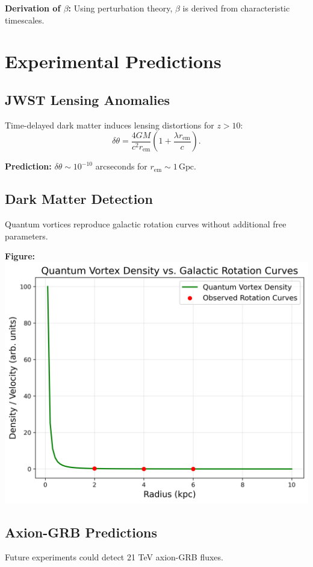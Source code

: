 \documentclass[12pt,a4paper]{article}
\begin{document}
\textbf{Derivation of $\beta$:} Using perturbation theory, $\beta$ is derived from characteristic timescales.

\section{Experimental Predictions}
\subsection{JWST Lensing Anomalies}
Time-delayed dark matter induces lensing distortions for $z > 10$:
\[
\delta\theta = \frac{4GM}{c^2 r_{\text{em}}} \left( 1 + \frac{\lambda r_{\text{em}}}{c} \right).
\]

\textbf{Prediction:} $\delta\theta \sim 10^{-10}$ arcseconds for $r_{\text{em}} \sim 1 \, \text{Gpc}$.

\subsection{Dark Matter Detection}
Quantum vortices reproduce galactic rotation curves without additional free parameters.

\textbf{Figure:} \includegraphics[width=\linewidth]{dm_vortices.png}

\subsection{Axion-GRB Predictions}
Future experiments could detect 21 TeV axion-GRB fluxes.
\end{document}
